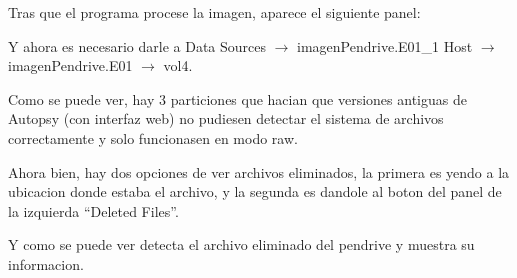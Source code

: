 \documentclass{article}
\begin{document}

Tras que el programa procese la imagen, aparece el siguiente panel:


Y ahora es necesario darle a Data Sources $\rightarrow$ imagenPendrive.E01\_1 Host $\rightarrow$ imagenPendrive.E01 $\rightarrow$ vol4.


Como se puede ver, hay 3 particiones que hacian que versiones antiguas de Autopsy (con interfaz web) no pudiesen detectar el sistema de archivos correctamente y solo funcionasen en modo raw.

Ahora bien, hay dos opciones de ver archivos eliminados, la primera es yendo a la ubicacion donde estaba el archivo, y la segunda es dandole al boton del panel de la izquierda ``Deleted Files''.


Y como se puede ver detecta el archivo eliminado del pendrive y muestra su informacion.
\end{document}
